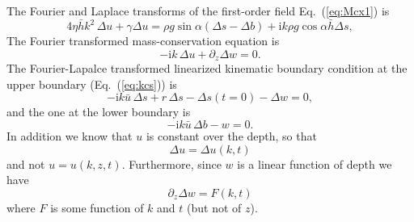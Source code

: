 \documentclass[10pt,a4paper]{book}
\newcommand{\p}{\partial}
\newcommand{\I}{\mathrm{i}}
\begin{document}
The Fourier and Laplace transforms of the first-order field
Eq.~(\ref{eq:Mcx1}) is
\begin{equation}
4 \eta \bar{h} k^2\, \Delta u + \gamma \Delta u  
= \rho g \sin \alpha (\Delta s-\Delta b)  + \I k \rho g \cos \alpha  \bar{h} \Delta s ,
\label{eq:Mcx1kl}
\end{equation}
The Fourier transformed mass-conservation equation is
\begin{equation}
-\I k \, \Delta u + \p_z  \Delta w =0.
\label{eq:Masskl}
\end{equation}
The Fourier-Lapalce transformed linearized kinematic boundary
condition at the upper boundary (Eq.~(\ref{eq:kcs})) is
\begin{equation}
-\I k \bar{u} \,\Delta s +r \, \Delta s - \Delta s(t=0) -\Delta w =0,
\label{eq:flbcs}
\end{equation}
and the one at the lower boundary is
\begin{equation}
-\I k \bar{u} \,\Delta b - w =0.
\label{eq:flbcb}
\end{equation}
In addition we know that $u$ is constant over the depth, so that
\begin{equation}
\Delta u=\Delta u(k,t)
\label{eq:ukt}
\end{equation}
and not $u=u(k,z,t)$. Furthermore, since $w$ is a linear function of
depth we have
\begin{equation}
\p_z \Delta w= F(k,t)
\label{eq:wkt}
\end{equation}
where $F$ is some function of $k$ and $t$ (but not of $z$).
\end{document}
